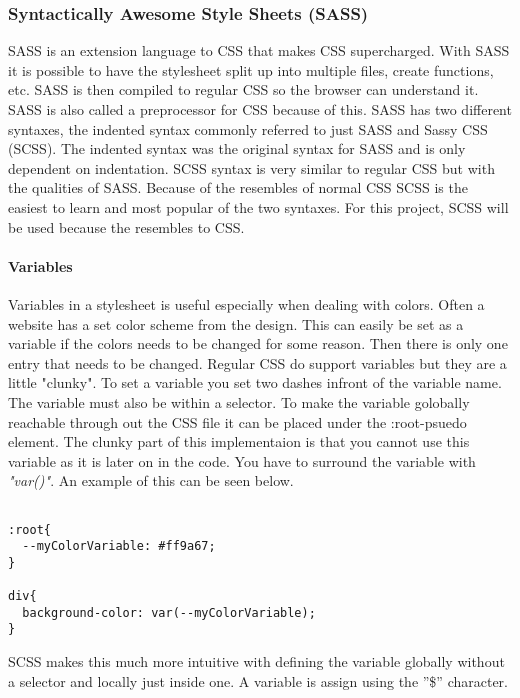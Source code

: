 \subsubsection{Syntactically Awesome Style Sheets (SASS)}%
\label{sub:sass}
SASS is an extension language to CSS that makes CSS supercharged. With SASS it is possible to have the stylesheet split up into multiple files, create functions, etc. SASS is then compiled to regular CSS so the browser can understand it. SASS is also called a preprocessor for CSS because of this. SASS has two different syntaxes, the indented syntax commonly referred to just SASS and Sassy CSS (SCSS). The indented syntax was the original syntax for SASS and is only dependent on indentation. SCSS syntax is very similar to regular CSS but with the qualities of SASS. Because of the resembles of normal CSS SCSS is the easiest to learn and most popular of the two syntaxes. For this project, SCSS will be used because the resembles to CSS.

\paragraph{Variables}
Variables in a stylesheet is useful especially when dealing with colors. Often a website has a set color scheme from the design. This can easily be set as a variable if the colors needs to be changed for some reason. Then there is only one entry that needs to be changed. Regular CSS do support variables but they are a little "clunky". To set a variable you set two dashes infront of the variable name. The variable must also be within a selector. To make the variable golobally reachable through out the CSS file it can be placed under the :root-psuedo element. The clunky part of this implementaion is that you cannot use this variable as it is later on in the code. You have to surround the variable with \textit{"var()"}. An example of this can be seen below.

\begin{lstlisting}[style=htmlcssjs]

:root{
  --myColorVariable: #ff9a67; 
}

div{
  background-color: var(--myColorVariable);
}
\end{lstlisting}



SCSS makes this much more intuitive with defining the variable globally without a selector and locally just inside one. A variable is assign using the ''\$'' character.

